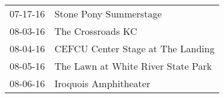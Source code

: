 \begin{supertabular}{p{0.25\columnwidth}p{0.75\columnwidth}}
 07-17-16 &              Stone Pony Summerstage \\
 08-03-16 &                   The Crossroads KC \\
 08-04-16 &   CEFCU Center Stage at The Landing \\
 08-05-16 &  The Lawn at White River State Park \\
 08-06-16 &               Iroquois Amphitheater \\
\end{supertabular}
